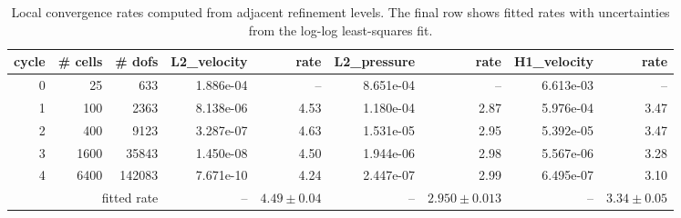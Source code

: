 \begin{table}[htbp]
\centering
\begin{tabular}{|r|r|r|r|r|r|r|r|r|}
\hline
cycle & \# cells & \# dofs & L2\_velocity & rate & L2\_pressure & rate & H1\_velocity & rate \\ \hline
0 & 25 & 633 & 1.886e-04 & -- & 8.651e-04 & -- & 6.613e-03 & -- \\ \hline
1 & 100 & 2363 & 8.138e-06 & 4.53 & 1.180e-04 & 2.87 & 5.976e-04 & 3.47 \\ \hline
2 & 400 & 9123 & 3.287e-07 & 4.63 & 1.531e-05 & 2.95 & 5.392e-05 & 3.47 \\ \hline
3 & 1600 & 35843 & 1.450e-08 & 4.50 & 1.944e-06 & 2.98 & 5.567e-06 & 3.28 \\ \hline
4 & 6400 & 142083 & 7.671e-10 & 4.24 & 2.447e-07 & 2.99 & 6.495e-07 & 3.10 \\ \hline
\multicolumn{3}{|r|}{fitted rate} & -- & $4.49 \pm 0.04$ & -- & $2.950 \pm 0.013$ & -- & $3.34 \pm 0.05$ \\ \hline
\end{tabular}
\caption{Local convergence rates computed from adjacent refinement levels. The final row shows fitted rates with uncertainties from the log-log least-squares fit.}
\end{table}
